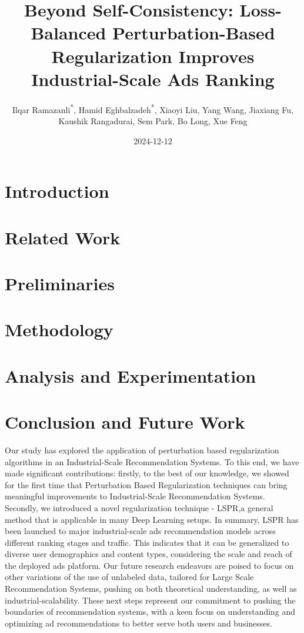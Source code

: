\documentclass[]{fairmeta}
\title{Beyond Self-Consistency: Loss-Balanced Perturbation-Based Regularization Improves Industrial-Scale Ads Ranking}
\author[1]{Ilqar Ramazanli\textsuperscript{*}, Hamid Eghbalzadeh\textsuperscript{*}, Xiaoyi Liu, Yang Wang, Jiaxiang Fu, Kaushik Rangadurai, Sem Park, Bo Long, Xue Feng}
\affiliation[1]{AI at Meta}
\date{2024-12-12}
\newcommand{\newmaterial}[1]{{#1}}
\begin{document}
\maketitle

\section{Introduction} 
\label{sec:intro}


\section{Related Work}
\label{sec:related_work}



\section{Preliminaries}
\label{subsec:numerical_setup}


\section{Methodology}
\label{sec:modeling}


\section{Analysis and Experimentation }
\label{sec:experiments}



\section{Conclusion and Future Work}
\label{sec:conclusion_related}

Our study has explored the application of perturbation based regularization algorithms in an Industrial-Scale Recommendation Systems. 
To this end, we have made significant contributions: firstly, to the best of our knowledge, we showed for the first time that Perturbation Based Regularization techniques can bring meaningful improvements to Industrial-Scale Recommendation Systems.
Secondly, we introduced a novel regularization technique - LSPR,a general method that is applicable in many Deep Learning setups.
\newmaterial{In summary, LSPR has been launched to major industrial-scale ads recommendation models across different ranking stages and traffic. This indicates that it can be generalized to diverse user demographics and content types, considering the scale and reach of the deployed ads platform.}
Our future research endeavors are poised to focus on other variations of the use of unlabeled data, tailored for Large Scale Recommendation Systems, pushing on both theoretical understanding, as well as industrial-scalability.
These next steps represent our commitment to pushing the boundaries of recommendation systems, with a keen focus on understanding and optimizing ad recommendations to better serve both users and businesses.



\clearpage
\newpage


\end{document}
